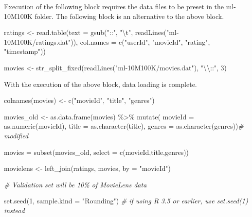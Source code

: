 \documentclass[
]{article}
\newenvironment{Shaded}{}{}
\newcommand{\AttributeTok}[1]{\textcolor[rgb]{0.49,0.56,0.16}{#1}}
\newcommand{\CommentTok}[1]{\textcolor[rgb]{0.38,0.63,0.69}{\textit{#1}}}
\newcommand{\DecValTok}[1]{\textcolor[rgb]{0.25,0.63,0.44}{#1}}
\newcommand{\FunctionTok}[1]{\textcolor[rgb]{0.02,0.16,0.49}{#1}}
\newcommand{\NormalTok}[1]{#1}
\newcommand{\OtherTok}[1]{\textcolor[rgb]{0.00,0.44,0.13}{#1}}
\newcommand{\SpecialCharTok}[1]{\textcolor[rgb]{0.25,0.44,0.63}{#1}}
\newcommand{\StringTok}[1]{\textcolor[rgb]{0.25,0.44,0.63}{#1}}
\begin{document}
Execution of the following block requires the data files to be preset in
the ml-10M100K folder. The following block is an alternative to the
above block.

\begin{Shaded}
\begin{Highlighting}[]
\NormalTok{ratings }\OtherTok{\textless{}{-}} \FunctionTok{read.table}\NormalTok{(}\AttributeTok{text =} \FunctionTok{gsub}\NormalTok{(}\StringTok{"::"}\NormalTok{, }\StringTok{"}\SpecialCharTok{\textbackslash{}t}\StringTok{"}\NormalTok{, }\FunctionTok{readLines}\NormalTok{(}\StringTok{"ml{-}10M100K/ratings.dat"}\NormalTok{)),}
                      \AttributeTok{col.names =} \FunctionTok{c}\NormalTok{(}\StringTok{"userId"}\NormalTok{, }\StringTok{"movieId"}\NormalTok{, }\StringTok{"rating"}\NormalTok{, }\StringTok{"timestamp"}\NormalTok{))}

\NormalTok{movies }\OtherTok{\textless{}{-}} \FunctionTok{str\_split\_fixed}\NormalTok{(}\FunctionTok{readLines}\NormalTok{(}\StringTok{"ml{-}10M100K/movies.dat"}\NormalTok{), }\StringTok{"}\SpecialCharTok{\textbackslash{}\textbackslash{}}\StringTok{::"}\NormalTok{, }\DecValTok{3}\NormalTok{)}
\end{Highlighting}
\end{Shaded}

With the execution of the above block, data loading is complete.

\begin{Shaded}
\begin{Highlighting}[]
\FunctionTok{colnames}\NormalTok{(movies) }\OtherTok{\textless{}{-}} \FunctionTok{c}\NormalTok{(}\StringTok{"movieId"}\NormalTok{, }\StringTok{"title"}\NormalTok{, }\StringTok{"genres"}\NormalTok{)}

\NormalTok{movies\_old }\OtherTok{\textless{}{-}} \FunctionTok{as.data.frame}\NormalTok{(movies) }\SpecialCharTok{\%\textgreater{}\%} \FunctionTok{mutate}\NormalTok{(}
                                           \AttributeTok{movieId =} \FunctionTok{as.numeric}\NormalTok{(movieId),}
                                           \AttributeTok{title =} \FunctionTok{as.character}\NormalTok{(title),}
                                           \AttributeTok{genres =} \FunctionTok{as.character}\NormalTok{(genres))}\CommentTok{\# modified}

\NormalTok{movies }\OtherTok{=} \FunctionTok{subset}\NormalTok{(movies\_old, }\AttributeTok{select =} \FunctionTok{c}\NormalTok{(movieId,title,genres))}

\NormalTok{movielens }\OtherTok{\textless{}{-}} \FunctionTok{left\_join}\NormalTok{(ratings, movies, }\AttributeTok{by =} \StringTok{"movieId"}\NormalTok{)}

\CommentTok{\# Validation set will be 10\% of MovieLens data}

\FunctionTok{set.seed}\NormalTok{(}\DecValTok{1}\NormalTok{, }\AttributeTok{sample.kind =} \StringTok{"Rounding"}\NormalTok{) }\CommentTok{\# if using R 3.5 or earlier, use \textasciigrave{}set.seed(1)\textasciigrave{} instead}
\end{Highlighting}
\end{Shaded}
\end{document}
